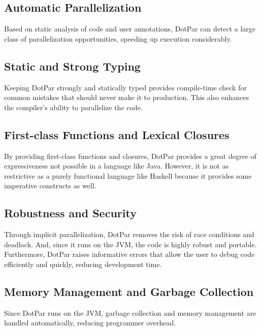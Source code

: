 \documentclass{article}
\begin{document}
\subsection{Automatic Parallelization}
Based on static analysis of code and user annotations, DotPar can
detect a large class of parallelization opportunities, speeding up
execution considerably.

\subsection{Static and Strong Typing}
Keeping DotPar strongly and statically typed provides compile-time
check for common mistakes that should never make it to
production. This also enhances the compiler’s ability to parallelize
the code.

\subsection{First-class Functions and Lexical Closures}
By providing first-class functions and closures, DotPar provides a
great degree of expressiveness not possible in a language like
Java. However, it is not as restrictive as a purely functional
language like Haskell because it provides some imperative constructs
as well.

\subsection{Robustness and Security}
Through implicit parallelization, DotPar removes the risk of race
conditions and deadlock.  And, since it runs on the JVM, the code is
highly robust and portable. Furthermore, DotPar raises informative
errors that allow the user to debug code efficiently and quickly,
reducing development time.

\subsection{Memory Management and Garbage Collection}
Since DotPar runs on the JVM, garbage collection and memory management
are handled automatically, reducing programmer overhead.
\end{document}
